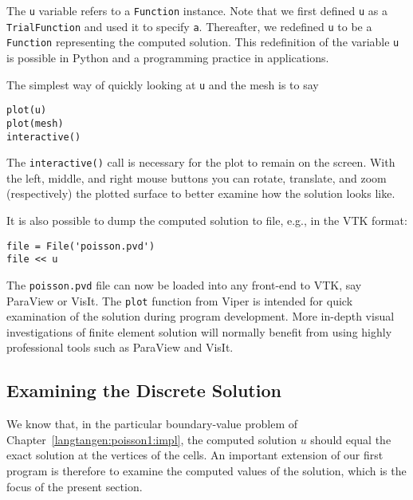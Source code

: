 The {\fontsize{12pt}{12pt}\verb!u!} variable refers to 
a {\fontsize{12pt}{12pt}\verb!Function!} instance. Note that we first defined {\fontsize{12pt}{12pt}\texttt{u}} as
a {\fontsize{12pt}{12pt}\texttt{TrialFunction}} and used it to specify {\fontsize{12pt}{12pt}\texttt{a}}.
Thereafter, we redefined {\fontsize{12pt}{12pt}\texttt{u}} to be a {\fontsize{12pt}{12pt}\texttt{Function}} representing
the computed solution. This redefinition of the variable {\fontsize{12pt}{12pt}\texttt{u}}
is possible in Python and a programming practice in \fenics{}
applications.

The simplest way of quickly looking at {\fontsize{12pt}{12pt}\texttt{u}} and the mesh
is to say
\begin{Verbatim}[fontsize=\fontsize{10pt}{10pt},tabsize=8,baselinestretch=1.05,
fontfamily=tt,xleftmargin=7mm]
plot(u)
plot(mesh)
interactive()
\end{Verbatim}
\noindent
The {\fontsize{12pt}{12pt}\verb!interactive()!} call is necessary for the plot to remain on the
screen. With the left, middle, and right 
mouse buttons you can rotate, translate, and zoom
(respectively) the plotted surface to better examine how the solution looks
like.

It is also possible to dump the computed solution to file, e.g., in the
VTK format:
\begin{Verbatim}[fontsize=\fontsize{10pt}{10pt},tabsize=8,baselinestretch=1.05,
fontfamily=tt,xleftmargin=7mm]
file = File('poisson.pvd')
file << u
\end{Verbatim}
\noindent
{}
The {\fontsize{12pt}{12pt}\verb!poisson.pvd!} file can now be loaded into any 
front-end to VTK, say ParaView or VisIt. The {\fontsize{12pt}{12pt}\texttt{plot}} function from Viper
is intended for quick examination of the solution during program development.
More in-depth visual investigations of finite element solution will
normally benefit from using highly professional tools such as ParaView and
VisIt.


\subsection{Examining the Discrete Solution}
\label{langtangen:poisson1:verify1}

We know that, in the particular boundary-value problem of Chapter~\ref{langtangen:poisson1:impl}, the computed solution $u$ should equal the exact
solution at the vertices of the cells.
An important extension of our first program is therefore to
examine the computed values of the solution, which is the focus of the
present section.

